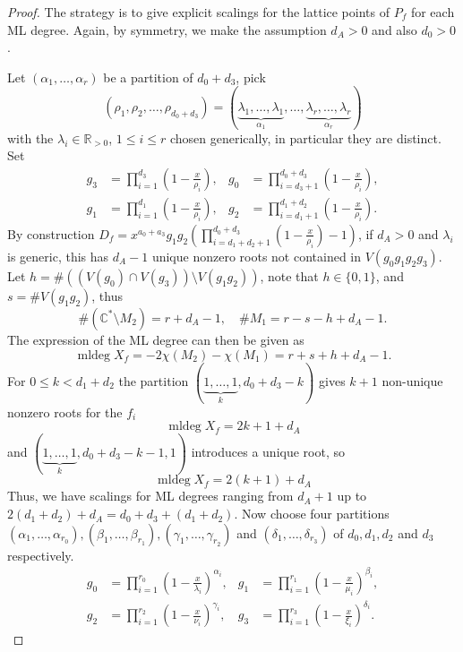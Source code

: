 \documentclass[12pt,reqno]{amsart}   	%
\theoremstyle{plain}
\theoremstyle{definition}
\theoremstyle{remark}
\newcommand{\R}{\mathbb{R}}
\newcommand{\C}{\mathbb{C}}
\newcommand{\mldeg}{\operatorname{mldeg}}
\begin{document}
\begin{proof}
    The strategy is to give explicit scalings for the lattice points of $P_f$ for each ML degree. Again, by symmetry, we make the assumption $d_A > 0$ and also $d_0 > 0$.

    
    Let $(\alpha _1,\dots, \alpha_r)$ be a partition of $d_0+d_3$, pick 
    \[ 
        (\rho _1, \rho_2,\dots, \rho_{d_0+d_3}) = (\underbrace{\lambda_1,\dots,\lambda_1}_{\alpha_1},\dots,\underbrace{\lambda_r,\dots,\lambda_r}_{\alpha_r})
    \]
    with the $\lambda _i \in \R _{>0}$, $1\leq i \leq r$ chosen generically, in particular they are distinct. Set
    \[
    \begin{aligned}
        g_3&=\prod_{i=1}^{d_3}\left(1-\frac{x}{\rho_i}\right),
        &
        g_0&=\prod_{i=d_3+1}^{d_0+d_3}\left(1-\frac{x}{\rho_i}\right),\\
        g_1&=\prod_{i=1}^{d_1}\left(1-\frac{x}{\rho_i}\right),
        &
        g_2&=\prod_{i=d_1+1}^{d_1+d_2}\left(1-\frac{x}{\rho_i}\right).
    \end{aligned}
    \]
    By construction $D_f = x^{a_0+a_3}g_1g_2(\prod_{i=d_1+d_2+1}^{d_0+d_3}(1-\frac{x}{\rho_i})-1) $, if $d_A > 0$ and  $\lambda_i$ is generic, this has $d_{A}-1$ unique nonzero roots not contained in $V(g_0g_1g_2g_3)$. Let $h = \# ((V(g_0) \cap V(g_3))\setminus V(g_1g_2))$, note that $h\in \{0,1\}$, and $s = \# V(g_1g_2)$, thus
    \[
    \# (\C^\ast \setminus M_2) = r+d_A-1, \quad \# M_1 = r-s-h+d_A-1.
    \]
    The expression of the ML degree can then be given as
    \[
        \mldeg X_f = -2 \chi (M_2) - \chi (M_1) = r+s+h+d_A-1.
    \]
    For $0\leq k < d_1+d_2$ the partition $(\underbrace{1,\dots,1}_{k},d_0+d_3-k)$ gives $k+1$ non-unique nonzero roots for the $f_i$ 
    \[
        \mldeg X_f = 2k+1+d_A
    \]
    and $(\underbrace{1,\dots,1}_{k},d_0+d_3-k-1,1)$ introduces a unique root, so
    \[ 
        \mldeg X_f = 2(k+1) + d_A
    \]
    Thus, we have scalings for ML degrees ranging from $d_A+1$ up to $2(d_1+d_2)+d_A=d_0+d_3+(d_1+d_2)$. 
    Now choose four partitions $(\alpha_1,\dots,\alpha_{r_0}), (\beta_1,\dots,\beta_{r_1}),(\gamma_1, \dots, \gamma_{r_2})$ and $(\delta_1,\dots,\delta_{r_3})$ of $d_0,d_1,d_2$ and $d_3$ respectively. 
    \[
\begin{aligned}
    g_0 &= \prod_{i=1}^{r_0} \left( 1 - \frac{x}{\lambda_i}\right)^{\alpha_i}, &
    g_1 &= \prod_{i=1}^{r_1} \left( 1 - \frac{x}{\mu_i}\right)^{\beta_i} ,\\
    g_2 &= \prod_{i=1}^{r_2} \left( 1 - \frac{x}{\nu _i}\right)^{\gamma_i}, &
    g_3 &= \prod_{i=1}^{r_3} \left( 1 - \frac{x}{\xi _i}\right)^{\delta_i}.

\end{aligned}\]
\end{proof}
\end{document}
